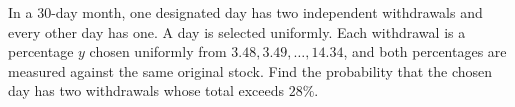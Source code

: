In a $30$-day month, one designated day has two independent withdrawals and every other day has one. A day is selected uniformly. Each withdrawal is a percentage $y$ chosen uniformly from $3.48,3.49,\ldots,14.34$, and both percentages are measured against the same original stock. Find the probability that the chosen day has two withdrawals whose total exceeds $28\%$.
